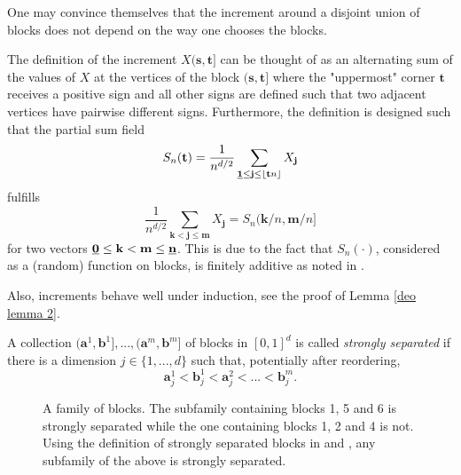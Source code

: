 \begin{remark}
    One may convince themselves that the increment around a disjoint union of blocks does not depend on the way one chooses the blocks.
\end{remark}

\begin{remark}
    The definition of the increment $X(\mathbf{s}, \mathbf{t}]$ can be thought of as an alternating sum of the values of $X$ at the vertices of the block $(\mathbf{s}, \mathbf{t}]$ where the "uppermost" corner $\mathbf{t}$ receives a positive sign and all other signs are defined such that two adjacent vertices have pairwise different signs. Furthermore, the definition is designed such that the partial sum field 
    \[ S_n(\mathbf{t}) = \frac{1}{n^{d/2}} \sum\limits_{\usbf[1] \leq \mathbf{j} \leq \floor{\mathbf{t} n}} X_\mathbf{j} \]
    fulfills
    \begin{equation} \label{partial sum field increment}
        \frac{1}{n^{d/2}} \sum\limits_{\mathbf{k} < \mathbf{j} \leq \mathbf{m}} X_\mathbf{j} = S_n(\mathbf{k}/n, \mathbf{m}/n]
    \end{equation}
    for two vectors $\usbf[0] \leq \mathbf{k} < \mathbf{m} \leq \usbf[n]$. This is due to the fact that $S_n(\cdot)$, considered as a (random) function on blocks, is finitely additive as noted in \cite{[3]Bickel1971ConvergenceCriteria}.

    Also, increments behave well under induction, see the proof of Lemma \ref{deo lemma 2}.
\end{remark}


\begin{defn} \label{defn: strongly separated blocks}
    A collection $(\mathbf{a}^1, \mathbf{b}^1], ..., (\mathbf{a}^m, \mathbf{b}^m]$ of blocks in $[0, 1]^d$ is called \textit{strongly separated} if there is a dimension $j \in \{1, ..., d\}$ such that, potentially after reordering,
    \[ \mathbf{a}_j^1 < \mathbf{b}_j^1 < \mathbf{a}_j^2 < ... < \mathbf{b}_j^m. \]
\end{defn}

\begin{figure} \label{figure:strongly separated blocks}
    \centering
    \def\svgwidth{0.5\columnwidth} 
    
    \caption{A family of blocks. The subfamily containing blocks 1, 5 and 6 is strongly separated while the one containing blocks 1, 2 and 4 is not. Using the definition of strongly separated blocks in \cite{[0]BUCCHIA2017344} and \cite{[16]deo1975functional}, any subfamily of the above is strongly separated.}
\end{figure}


